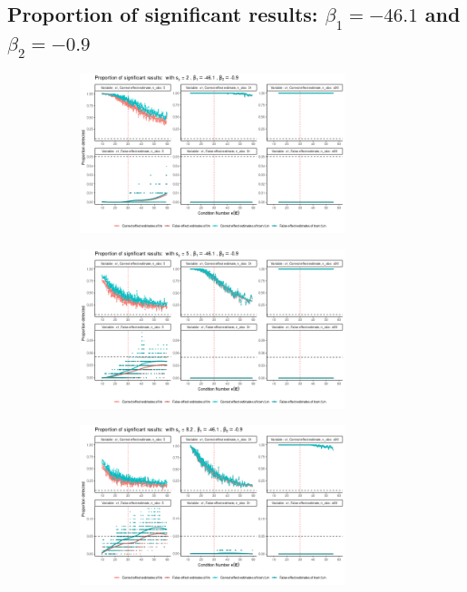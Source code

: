 \documentclass[11pt,a4paper,twoside]{book}\usepackage[]{graphicx}\usepackage[]{xcolor}
\begin{document}
\subsection{Proportion of significant results: $\beta_1=-46.1$ and $\beta_2=-0.9$}
\begin{figure}[H]
\begin{subfigure}[b]{1\textwidth}
\vspace*{-0.5cm}
\centering
\includegraphics[width=0.85\textwidth]{../fromsim/simres_prop11-1.png}
\end{subfigure}
\begin{subfigure}[b]{1\textwidth}
\vspace*{-0.9cm}
\centering
\includegraphics[width=0.85\textwidth]{../fromsim/simres_prop21-1.png}
\end{subfigure}
\begin{subfigure}[b]{1\textwidth}
\vspace*{-0.9cm}
\centering
\includegraphics[width=0.85\textwidth]{../fromsim/simres_prop31-1.png}

\end{subfigure}
\end{figure}
\end{document}

